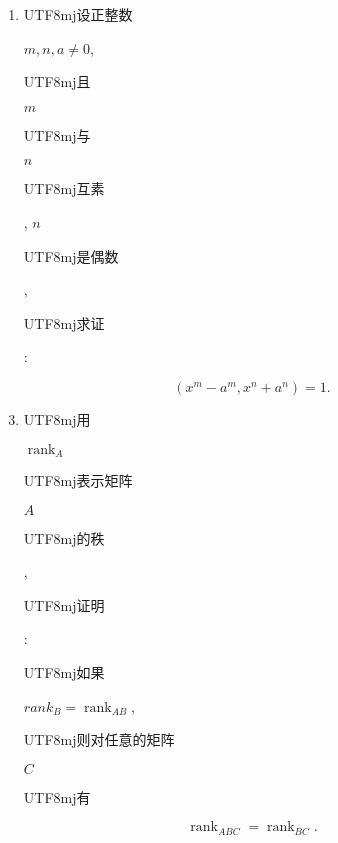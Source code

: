 \documentclass[10pt]{article}
\begin{document}
\begin{enumerate}
  \item \begin{CJK}{UTF8}{mj}设正整数\end{CJK} $m, n, a \neq 0$, \begin{CJK}{UTF8}{mj}且\end{CJK} $m$ \begin{CJK}{UTF8}{mj}与\end{CJK} $n$ \begin{CJK}{UTF8}{mj}互素\end{CJK}, $n$ \begin{CJK}{UTF8}{mj}是偶数\end{CJK}, \begin{CJK}{UTF8}{mj}求证\end{CJK}:
\end{enumerate}
$$
\left(x^{m}-a^{m}, x^{n}+a^{n}\right)=1 .
$$

\begin{enumerate}
  \setcounter{enumi}{2}
  \item \begin{CJK}{UTF8}{mj}用\end{CJK} $\operatorname{rank}_{A}$ \begin{CJK}{UTF8}{mj}表示矩阵\end{CJK} $A$ \begin{CJK}{UTF8}{mj}的秩\end{CJK}, \begin{CJK}{UTF8}{mj}证明\end{CJK}: \begin{CJK}{UTF8}{mj}如果\end{CJK} $r a n k_{B}=\operatorname{rank}_{A B}$, \begin{CJK}{UTF8}{mj}则对任意的矩阵\end{CJK} $C$ \begin{CJK}{UTF8}{mj}有\end{CJK}
\end{enumerate}
$$
\operatorname{rank}_{A B C}=\operatorname{rank}_{B C} .
$$
\end{document}
